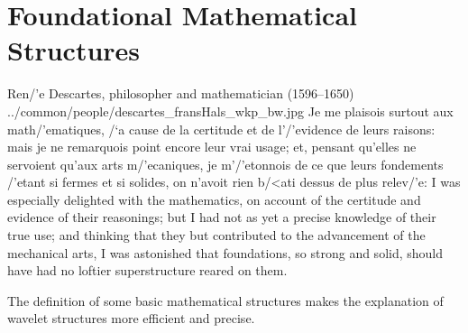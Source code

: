 ﻿%

\chapter{Foundational Mathematical Structures}

\qboxnpqt
  {Ren/'e Descartes, philosopher and mathematician (1596--1650)
   \footnotemark}
  {../common/people/descartes_fransHals_wkp_bw.jpg}
  {Je me plaisois surtout aux math/'ematiques,
    /`a cause de la certitude et de l'/'evidence de leurs raisons:
    mais je ne remarquois point encore leur vrai usage;
    et, pensant qu'elles ne servoient qu'aux arts m/'ecaniques,
    je m'/'etonnois de ce que leurs fondements /'etant si fermes et si solides,
    on n'avoit rien b/<ati dessus de plus relev/'e:}
  {I was especially delighted with the mathematics,
    on account of the certitude and evidence of their reasonings;
    but I had not as yet a precise knowledge of their true use;
    and thinking that they but contributed to the advancement of the mechanical arts,
    I was astonished that foundations, so strong and solid,
    should have had no loftier superstructure reared on them.}

The definition of some basic mathematical structures makes the explanation of wavelet structures more efficient and precise.
